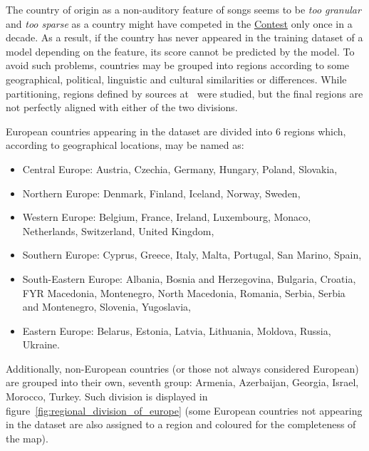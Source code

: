 \documentclass[conference, a4paper, 12pt]{IEEEtran}
\begin{document}
    \par

    The country of origin as a non-auditory feature of songs seems to be \emph{too granular} and \emph{too sparse} as a country might have competed in the \href{http://eurovision.tv/}{Contest} only once in a decade. As a result, if the country has never appeared in the training dataset of a model depending on the feature, its score cannot be predicted by the model. To avoid such problems, countries may be grouped into regions according to some geographical, political, linguistic and cultural similarities or differences. While partitioning, regions defined by sources at~\cite{bib:EUEV,bib:CIAFB} were studied, but the final regions are not perfectly aligned with either of the two divisions.

    \par

    European countries appearing in the dataset are divided into $ 6 $ regions which, according to geographical locations, may be named as:
    \begin{itemize}
        \item Central Europe: Austria, Czechia, Germany, Hungary, Poland, Slovakia,
        \item Northern Europe: Denmark, Finland, Iceland, Norway, Sweden,
        \item Western Europe: Belgium, France, Ireland, Luxembourg, Monaco, Netherlands, Switzerland, United Kingdom,
        \item Southern Europe: Cyprus, Greece, Italy, Malta, Portugal, San Marino, Spain,
        \item South-Eastern Europe: Albania, Bosnia and Herzegovina, Bulgaria, Croatia, FYR Macedonia, Montenegro, North Macedonia, Romania, Serbia, Serbia and Montenegro, Slovenia, Yugoslavia,
        \item Eastern Europe: Belarus, Estonia, Latvia, Lithuania, Moldova, Russia, Ukraine.
    \end{itemize}
    Additionally, non-European countries (or those not always considered European) are grouped into their own, seventh group: Armenia, Azerbaijan, Georgia, Israel, Morocco, Turkey. Such division is displayed in figure~\ref{fig:regional_division_of_europe} (some European countries not appearing in the dataset are also assigned to a region and coloured for the completeness of the map).

    \par
\end{document}
